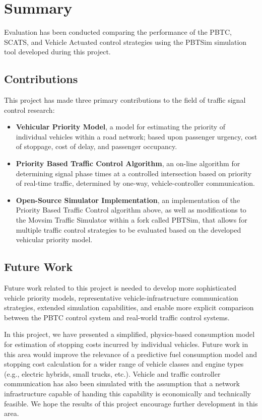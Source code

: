 \chapter{Summary}
 
Evaluation has been conducted comparing the performance of the PBTC, SCATS, and Vehicle Actuated control strategies using the PBTSim simulation tool developed during this project.

\section{Contributions}

This project has made three primary contributions to the field of traffic signal control research:

\begin{itemize}
\item \textbf{Vehicular Priority Model}, a model for estimating the priority of individual vehicles within a road network; based upon passenger urgency, cost of stoppage, cost of delay, and passenger occupancy.
\item \textbf{Priority Based Traffic Control Algorithm}, an on-line algorithm for determining signal phase times at a controlled intersection based on priority of real-time traffic, determined by one-way, vehicle-controller communication. 
\item \textbf{Open-Source Simulator Implementation}, an implementation of the Priority Based Traffic Control algorithm above, as well as modifications to the Movsim Traffic Simulator within a fork called PBTSim, that allows for multiple traffic control strategies to be evaluated based on the developed vehicular priority model.
\end{itemize}
 
\section{Future Work}

Future work related to this project is needed to develop more sophisticated vehicle priority models, representative vehicle-infrastructure communication strategies, extended simulation capabilities, and enable more explicit comparison between the PBTC control system and real-world traffic control systems.

In this project, we have presented a simplified, physics-based consumption model for estimation of stopping costs incurred by individual vehicles. Future work in this area would improve the relevance of a predictive fuel consumption model and stopping cost calculation for a wider range of vehicle classes and engine types (e.g., electric hybrids, small trucks, etc.). Vehicle and traffic controller communication has also been simulated with the assumption that a network infrastructure capable of handing this capability is economically and technically feasible. We hope the results of this project encourage further development in this area.

